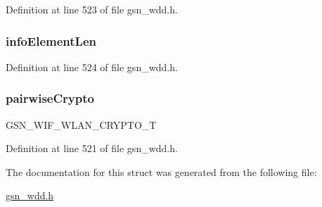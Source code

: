 Definition at line 523 of file gsn\_\-wdd.h.

\hypertarget{a00292_a46d032f9b1c2c11576045847162b9522}{
\subsubsection[{infoElementLen}]{ {\bf infoElementLen}}}
\label{a00292_a46d032f9b1c2c11576045847162b9522}


Definition at line 524 of file gsn\_\-wdd.h.

\hypertarget{a00292_aea9ac9a7170aa6715444395f9b97f1ca}{
\subsubsection[{pairwiseCrypto}]{ {\bf pairwiseCrypto}}}
\label{a00292_aea9ac9a7170aa6715444395f9b97f1ca}
GSN\_\-WIF\_\-WLAN\_\-CRYPTO\_\-T 

Definition at line 521 of file gsn\_\-wdd.h.



The documentation for this struct was generated from the following file:\begin{DoxyCompactItemize}
\item 
\hyperlink{a00603}{gsn\_\-wdd.h}\end{DoxyCompactItemize}
